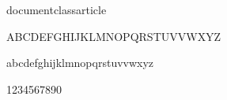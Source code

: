 documentclass{article}
\usepackage{aecompl}


ABCDEFGHIJKLMNOPQRSTUVVWXYZ

abcdefghijklmnopqrstuvvwxyz

1234567890


